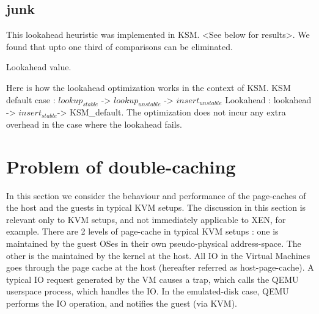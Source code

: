 \documentclass[10pt,a4paper]{article}
\begin{document}



\subsection {junk}
This lookahead heuristic was implemented in KSM. <See below for results>. 
We found that upto one third of comparisons can be eliminated.

Lookahead value.

Here is how the lookahead optimization works in the context of KSM. 
KSM default case : $lookup_{stable}$ -> $lookup_{unstable}$ -> $insert_{unstable}$
Lookahead : lookahead -> $insert_{stable}$-> KSM\_default.
The optimization does not incur any extra overhead in the case where the lookahead fails.



\section{Problem of double-caching}
In this section we consider the behaviour and performance of the page-caches of the host and the guests in typical KVM setups. The discussion in this section is relevant only to KVM setups, and not immediately applicable to XEN, for example.
There are 2 levels of page-cache in typical KVM setups : one is maintained by the guest OSes in their own pseudo-physical address-space. The other is the maintained by the kernel at the host. 
All IO in the Virtual Machines goes through the page cache at the host (hereafter referred as host-page-cache). A typical IO request generated by the VM causes a trap, which calls the QEMU userspace process, which handles the IO. In the emulated-disk case, QEMU performs the IO operation, and notifies the guest (via KVM). 
\end{document}
